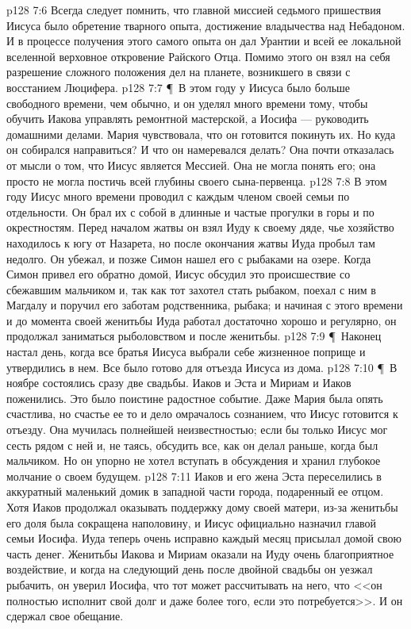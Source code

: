 \vs p128 7:6 Всегда следует помнить, что главной миссией седьмого пришествия Иисуса было обретение тварного опыта, достижение владычества над Небадоном. И в процессе получения этого самого опыта он дал Урантии и всей ее локальной вселенной верховное откровение Райского Отца. Помимо этого он взял на себя разрешение сложного положения дел на планете, возникшего в связи с восстанием Люцифера.
\vs p128 7:7 \P\ В этом году у Иисуса было больше свободного времени, чем обычно, и он уделял много времени тому, чтобы обучить Иакова управлять ремонтной мастерской, а Иосифа --- руководить домашними делами. Мария чувствовала, что он готовится покинуть их. Но куда он собирался направиться? И что он намеревался делать? Она почти отказалась от мысли о том, что Иисус является Мессией. Она не могла понять его; она просто не могла постичь всей глубины своего сына\hyp{}первенца.
\vs p128 7:8 В этом году Иисус много времени проводил с каждым членом своей семьи по отдельности. Он брал их с собой в длинные и частые прогулки в горы и по окрестностям. Перед началом жатвы он взял Иуду к своему дяде, чье хозяйство находилось к югу от Назарета, но после окончания жатвы Иуда пробыл там недолго. Он убежал, и позже Симон нашел его с рыбаками на озере. Когда Симон привел его обратно домой, Иисус обсудил это происшествие со сбежавшим мальчиком и, так как тот захотел стать рыбаком, поехал с ним в Магдалу и поручил его заботам родственника, рыбака; и начиная с этого времени и до момента своей женитьбы Иуда работал достаточно хорошо и регулярно, он продолжал заниматься рыболовством и после женитьбы.
\vs p128 7:9 \P\ Наконец настал день, когда все братья Иисуса выбрали себе жизненное поприще и утвердились в нем. Все было готово для отъезда Иисуса из дома.
\vs p128 7:10 \P\ В ноябре состоялись сразу две свадьбы. Иаков и Эста и Мириам и Иаков поженились. Это было поистине радостное событие. Даже Мария была опять счастлива, но счастье ее то и дело омрачалось сознанием, что Иисус готовится к отъезду. Она мучилась полнейшей неизвестностью; если бы только Иисус мог сесть рядом с ней и, не таясь, обсудить все, как он делал раньше, когда был мальчиком. Но он упорно не хотел вступать в обсуждения и хранил глубокое молчание о своем будущем.
\vs p128 7:11 Иаков и его жена Эста переселились в аккуратный маленький домик в западной части города, подаренный ее отцом. Хотя Иаков продолжал оказывать поддержку дому своей матери, из\hyp{}за женитьбы его доля была сокращена наполовину, и Иисус официально назначил главой семьи Иосифа. Иуда теперь очень исправно каждый месяц присылал домой свою часть денег. Женитьбы Иакова и Мириам оказали на Иуду очень благоприятное воздействие, и когда на следующий день после двойной свадьбы он уезжал рыбачить, он уверил Иосифа, что тот может рассчитывать на него, что <<он полностью исполнит свой долг и даже более того, если это потребуется>>. И он сдержал свое обещание.
